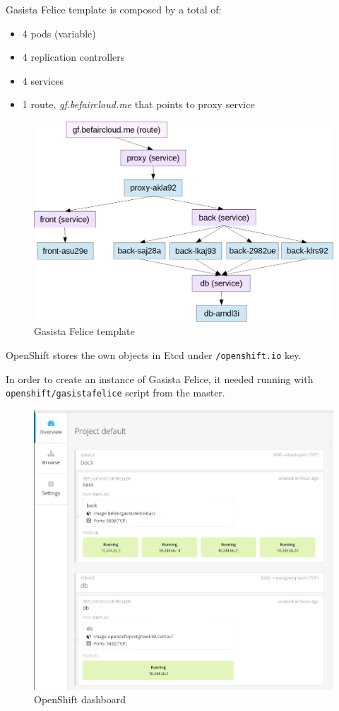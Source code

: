 Gasista Felice template is composed by a total of:

\begin{itemize}
\item 4 pods (variable)
\item 4 replication controllers
\item 4 services
\item 1 route, \textit{gf.befaircloud.me} that points to proxy service
\end{itemize}

\begin{figure}[htbp]
\centering
\includegraphics{media/ch5-template-gf.png}
\caption{Gasista Felice template}
\end{figure}

OpenShift stores the own objects in Etcd under \texttt{/openshift.io} key.

In order to create an instance of Gasista Felice, it needed running with \texttt{openshift/gasistafelice} script from the master.

\begin{figure}[htbp]
\centering
\includegraphics{media/ch5-openshift.png}
\caption{OpenShift dashboard}
\end{figure}

